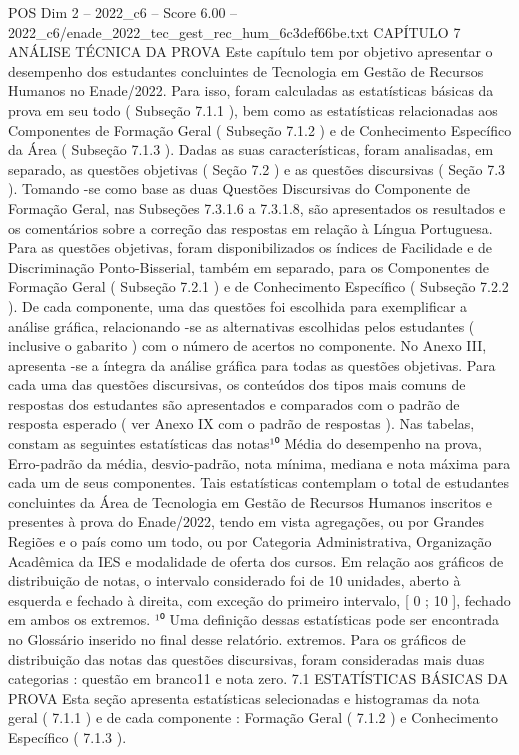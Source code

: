 \begin{textsample}{POS Dim 2 – 2022\_c6 – Score 6.00 – 2022\_c6/enade\_2022\_tec\_gest\_rec\_hum\_6c3def66be.txt}  \label{ex:f2_pos_137}
CAPÍTULO 7 ANÁLISE TÉCNICA DA PROVA Este capítulo tem por objetivo apresentar o desempenho dos estudantes concluintes de Tecnologia em Gestão de Recursos Humanos no Enade/2022.
Para isso, foram calculadas as estatísticas básicas da prova em seu todo ( Subseção 7.1.1 ), bem como as estatísticas relacionadas aos Componentes de Formação Geral ( Subseção 7.1.2 ) e de Conhecimento Específico da Área ( Subseção 7.1.3 ).
Dadas as suas características, foram analisadas, em separado, as questões objetivas ( Seção 7.2 ) e as questões discursivas ( Seção 7.3 ).
Tomando -se como base as duas Questões Discursivas do Componente de Formação Geral, nas Subseções 7.3.1.6 a 7.3.1.8, são apresentados os resultados e os comentários sobre a correção das respostas em relação à Língua Portuguesa.
Para as questões objetivas, foram disponibilizados os índices de Facilidade e de Discriminação Ponto-Bisserial, também em separado, para os Componentes de Formação Geral ( Subseção 7.2.1 ) e de Conhecimento Específico ( Subseção 7.2.2 ).
De cada componente, uma das questões foi escolhida para exemplificar a análise gráfica, relacionando -se as alternativas escolhidas pelos estudantes ( inclusive o gabarito ) com o número de acertos no componente.
No Anexo III, apresenta -se a íntegra da análise gráfica para todas as questões objetivas.
Para cada uma das questões discursivas, os conteúdos dos tipos mais comuns de respostas dos estudantes são apresentados e comparados com o padrão de resposta esperado ( ver Anexo IX com o padrão de respostas ).
Nas tabelas, constam as seguintes estatísticas das notas¹⁰ Média do desempenho na prova, Erro-padrão da média, desvio-padrão, nota mínima, mediana e nota máxima para cada um de seus componentes.
Tais estatísticas contemplam o total de estudantes concluintes da Área de Tecnologia em Gestão de Recursos Humanos inscritos e presentes à prova do Enade/2022, tendo em vista agregações, ou por Grandes Regiões e o país como um todo, ou por Categoria Administrativa, Organização Acadêmica da IES e modalidade de oferta dos cursos.
Em relação aos gráficos de distribuição de notas, o intervalo considerado foi de 10 unidades, aberto à esquerda e fechado à direita, com exceção do primeiro intervalo, [ 0 ; 10 ], fechado em ambos os extremos. ¹⁰ Uma definição dessas estatísticas pode ser encontrada no Glossário inserido no final desse relatório. extremos.
Para os gráficos de distribuição das notas das questões discursivas, foram consideradas mais duas categorias : questão em branco11 e nota zero. 7.1 ESTATÍSTICAS BÁSICAS DA PROVA Esta seção apresenta estatísticas selecionadas e histogramas da nota geral ( 7.1.1 ) e de cada componente : Formação Geral ( 7.1.2 ) e Conhecimento Específico ( 7.1.3 ).

\end{textsample}
